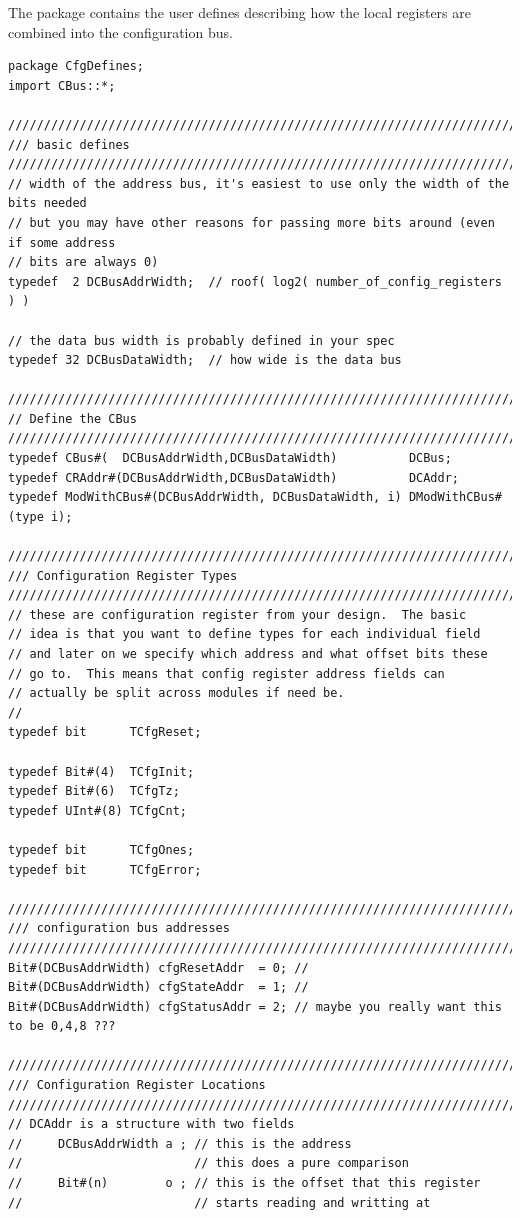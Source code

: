 The  package contains the user defines describing how
the local registers are combined into the configuration bus.
\begin{verbatim}
package CfgDefines;
import CBus::*;

////////////////////////////////////////////////////////////////////////////////
/// basic defines
////////////////////////////////////////////////////////////////////////////////
// width of the address bus, it's easiest to use only the width of the bits needed
// but you may have other reasons for passing more bits around (even if some address
// bits are always 0)
typedef  2 DCBusAddrWidth;  // roof( log2( number_of_config_registers ) )

// the data bus width is probably defined in your spec
typedef 32 DCBusDataWidth;  // how wide is the data bus

////////////////////////////////////////////////////////////////////////////////
// Define the CBus
////////////////////////////////////////////////////////////////////////////////
typedef CBus#(  DCBusAddrWidth,DCBusDataWidth)          DCBus;
typedef CRAddr#(DCBusAddrWidth,DCBusDataWidth)          DCAddr;
typedef ModWithCBus#(DCBusAddrWidth, DCBusDataWidth, i) DModWithCBus#(type i);

////////////////////////////////////////////////////////////////////////////////
/// Configuration Register Types
////////////////////////////////////////////////////////////////////////////////
// these are configuration register from your design.  The basic
// idea is that you want to define types for each individual field
// and later on we specify which address and what offset bits these
// go to.  This means that config register address fields can 
// actually be split across modules if need be.
//
typedef bit      TCfgReset;

typedef Bit#(4)  TCfgInit;
typedef Bit#(6)  TCfgTz;
typedef UInt#(8) TCfgCnt;

typedef bit      TCfgOnes;
typedef bit      TCfgError;

////////////////////////////////////////////////////////////////////////////////
/// configuration bus addresses
////////////////////////////////////////////////////////////////////////////////
Bit#(DCBusAddrWidth) cfgResetAddr  = 0; // 
Bit#(DCBusAddrWidth) cfgStateAddr  = 1; // 
Bit#(DCBusAddrWidth) cfgStatusAddr = 2; // maybe you really want this to be 0,4,8 ???

////////////////////////////////////////////////////////////////////////////////
/// Configuration Register Locations
////////////////////////////////////////////////////////////////////////////////
// DCAddr is a structure with two fields
//     DCBusAddrWidth a ; // this is the address
//                        // this does a pure comparison
//     Bit#(n)        o ; // this is the offset that this register
//                        // starts reading and writting at


\end{verbatim}
